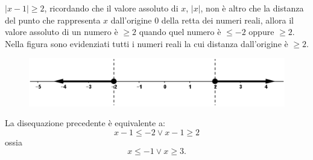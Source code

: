 \begin{esempio} $|x-1|\geq 2$, ricordando che il valore 
assoluto di $x$, $|x|$, non è altro che la distanza del punto che rappresenta 
$x$ dall'origine 0 della retta dei numeri reali, allora il valore assoluto di 
un numero è $\geq 2$ quando quel numero è $\leq -2$ oppure $\geq 2$.\\
        Nella figura sono evidenziati tutti i numeri reali la cui distanza 
dall'origine è $\geq 2$.

\begin{figure}[h]
\begin{center}
\begin{inaccessibleblock}[TODO]
\centering
\includegraphics[width=0.7\linewidth]{img/imm5} %
\end{inaccessibleblock}
\label{fig:abs_imm5}
\end{center}
\end{figure}

La disequazione precedente è equivalente a:
$$x-1\leq -2 \vee x-1 \geq 2$$
ossia
$$x\leq -1 \vee x\geq 3.$$
\end{esempio}













